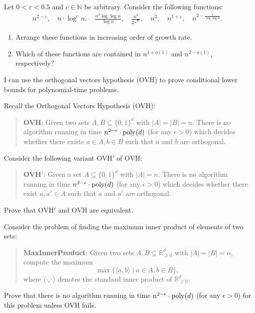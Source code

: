 \documentclass[english]{uebung_cs}
\begin{document}
\begin{exercise}[Fingerübungen]
  Let \( 0 < \varepsilon < 0.5 \) and \( c \in \mathbb{N} \) be arbitrary. Consider the following functions:
  \begin{align*}
    n^{2-\varepsilon},\quad
    n\cdot\log^c n,\quad
    \frac{n^2 \log\log n}{\log n},\quad
    \frac{n^2}{2^{\sqrt{n}}},\quad
    n^2,\quad
    n^{1+\varepsilon},\quad
    n^{2-\frac{1}{\log\log n}}.
  \end{align*}
  \begin{enumerate}
    \item Arrange these functions in increasing order of growth rate.
    \item Which of these functions are contained in \( n^{1+o(1)} \) and \( n^{2-o(1)} \), respectively?
  \end{enumerate}
\end{exercise}

\begin{skill}[OVH][\mandatory]
  I can use the orthogonal vectors hypothesis (OVH) to prove conditional lower bounds for polynomial-time problems.
\end{skill}

\begin{exercise}\label{ex:ovh-prime}
  Recall the Orthogonal Vectors Hypothesis (OVH):
  \begin{quote}
    \textbf{OVH}: Given two sets \( A, B \subseteq \{0, 1\}^d \) with \( |A| = |B| = n \). There is no algorithm running in time \( n^{2-\epsilon} \cdot \operatorname{poly}(d) \) (for any \( \epsilon > 0 \)) which decides whether there exists \( a \in A, b \in B \) such that \( a \) and \( b \) are orthogonal.
  \end{quote}
  Consider the following variant \( \text{OVH}' \) of \( \text{OVH} \):
  \begin{quote}
    \textbf{OVH}$\bm{'}$: Given a set \( A \subseteq \{0,1\}^d \) with \( |A| = n \). There is no algorithm running in time \( n^{2-\epsilon} \cdot \operatorname{poly}(d) \) (for any \( \epsilon > 0 \)) which decides whether there exist \( a, a' \in A \) such that \( a \) and \( a' \) are orthogonal.
  \end{quote}
  Prove that \( \text{OVH}' \) and \( \text{OVH} \) are equivalent.
\end{exercise}

\begin{exercise}
  Consider the problem of finding the maximum inner product of elements of two sets:
  \begin{quote}
    \textbf{MaxInnerProduct}: Given two sets \( A, B \subseteq \mathbb{R}_{\geq 0}^d \) with \( |A| = |B| = n \), compute the maximum
    \[
      \max\{\langle a, b\rangle \mid a \in A, b \in B\},
    \]
    where \( \langle \cdot, \cdot \rangle \) denotes the standard inner product of \( \mathbb{R}_{\geq 0}^d \).
  \end{quote}
  Prove that there is no algorithm running in time \( n^{2-\epsilon} \cdot \operatorname{poly}(d) \) (for any \( \epsilon > 0 \)) for this problem unless OVH fails.
\end{exercise}
\end{document}
